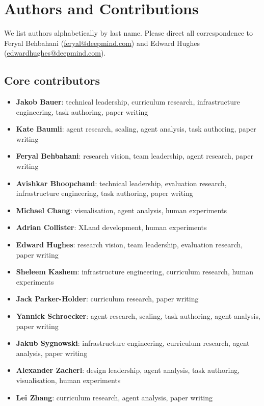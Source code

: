 \documentclass[11pt, a4paper, logo, copyright]{deepmind}
\begin{document}
\section{Authors and Contributions}
\label{sec:authors}
We list authors alphabetically by last name. Please direct all correspondence to Feryal Behbahani (\href{mailto:feryal@deepmind.com}{feryal@deepmind.com}) and Edward Hughes (\href{mailto:edwardhughes@deepmind.com}{edwardhughes@deepmind.com}).
\subsection{Core contributors}
\begin{itemize}
    \item \textbf{Jakob Bauer}: technical leadership, curriculum research, infrastructure engineering, task authoring, paper writing
    \item \textbf{Kate Baumli}: agent research, scaling, agent analysis, task authoring, paper writing
    \item \textbf{Feryal Behbahani}: research vision, team leadership, agent research, paper writing
    \item \textbf{Avishkar Bhoopchand}: technical leadership, evaluation research, infrastructure engineering, task authoring, paper writing
    \item \textbf{Michael Chang}: visualisation, agent analysis, human experiments
    \item \textbf{Adrian Collister}: XLand development, human experiments
    \item \textbf{Edward Hughes}: research vision, team leadership, evaluation research, paper writing
    \item \textbf{Sheleem Kashem}: infrastructure engineering, curriculum research, human experiments
    \item \textbf{Jack Parker-Holder}: curriculum research, paper writing
    \item \textbf{Yannick Schroecker}: agent research, scaling, task authoring, agent analysis, paper writing
    \item \textbf{Jakub Sygnowski}: infrastructure engineering, curriculum research, agent analysis, paper writing
    \item \textbf{Alexander Zacherl}: design leadership, agent analysis, task authoring, visualisation, human experiments
    \item \textbf{Lei Zhang}: curriculum research, agent analysis, paper writing
\end{itemize}
\end{document}
